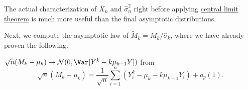 \begin{intuition}
	The actual characterization of \(\overline{X} _n\) and \(\hat{\sigma} _n^2\) right before applying \hyperref[thm:CLT]{central limit theorem} is much more useful than the final asymptotic distributions.
\end{intuition}

Next, we compute the asymptotic law of \(\widetilde{M} _k = M_k / \hat{\sigma} _k\), where we have already proven the following.

\begin{prev}
	\(\sqrt{n} (M_k - \mu _k) \to \mathcal{N} (0, \Var_{}[Y^k - k \mu _{k-1} Y] )\) from
	\[
		\sqrt{n} (M_k - \mu _k)
		= \frac{1}{\sqrt{n} } \sum_{i=1}^{n} (Y_i^k - \mu _k - k \mu _{k-1} Y_i) + o_p(1).
	\]
\end{prev}

